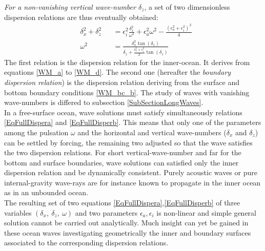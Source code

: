 \documentclass[a4paper,11pt]{article}
\begin{document}
\textit{For a non-vanishing vertical wave-number $\delta_z$}, a set of two dimensionless dispersion relations are thus eventually obtained:
\begin{subequations}
	\label{EqFullDisper}
	\begin{alignat}{2}	
		\label{EqFullDispera}
 		& \delta_x^2+\delta_z^2 &&=\epsilon_i^2\frac{\delta_x^2}
 			{\omega^2}+\epsilon_a^2\omega^2-\frac{(\epsilon_a^2+\epsilon_i^2)^2}{4}\\[3mm]
		\label{EqFullDisperb}
		& \omega^2 &&=\frac{\delta_x^2\tan(\delta_z)}
		{\delta_z+\frac{\epsilon_a^2+\epsilon_i^2}			{2}\tan(\delta_z)}
	\end{alignat}
\end{subequations}
The first relation is the dispersion relation for the inner-ocean. It derives from equations \ref{WM_a} to \ref{WM_d}. The second one (hereafter the \textit{boundary dispersion relation}) is the dispersion relation deriving from the surface and bottom boundary conditions \ref{WM_bc_b}. The study of waves with vanishing wave-numbers is differed to subsection \ref{SubSectionLongWaves}.\\
In a free-surface ocean, wave solutions must satisfy simultaneously relations \ref{EqFullDispera} and \ref{EqFullDisperb}. This means that only one of the parameters among the pulsation $\omega$ and the horizontal and vertical wave-numbers ($\delta_x$ and $\delta_z$) can be settled by forcing, the remaining two adjusted so that the wave satisfies the two dispersion relations. For short vertical-wave-number and far for the bottom and surface boundaries, wave solutions can satisfied only the inner dispersion relation and be dynamically consistent. Purely acoustic waves or pure internal-gravity wave-rays are for instance known to propagate in the inner ocean as in an unbounded ocean.\\
The resulting set of two equations \ref{EqFullDispera},\ref{EqFullDisperb} of three variables $(\delta_x,\  \delta_z,\ \omega)$ and two parameters $\epsilon_a, \epsilon_i$ is non-linear and simple general solution cannot be carried out analytically. Much insight can yet be gained in these ocean waves investigating geometrically the inner and boundary surfaces associated to the corresponding dispersion relations. 
\end{document}
